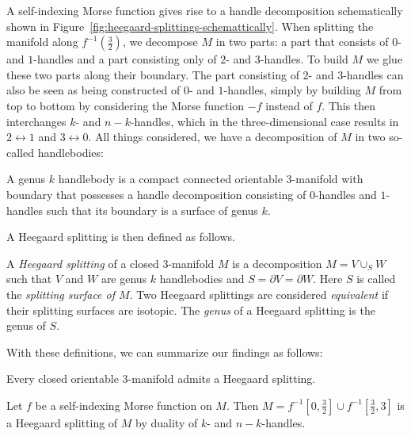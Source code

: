 A self-indexing Morse function gives rise to a handle decomposition schematically shown in Figure~\ref{fig:heegaard-splittings-schemattically}. When splitting the manifold along $f^{-1}(\frac{3}{2})$, we decompose $M$ in two parts: a part that consists of $0$- and $1$-handles and a part consisting only of $2$- and  $3$-handles.
To build $M$ we glue these two parts along their boundary.
The part consisting of $2$- and $3$-handles can also be seen as being constructed of $0$- and $1$-handles, simply by building $M$ from top to bottom by considering the Morse function $-f$ instead of $f$. This then interchanges $k$- and $n-k$-handles, which in the three-dimensional case results in $2 \leftrightarrow 1$ and  $3 \leftrightarrow 0$.
All things considered, we have a decomposition of $M$ in two so-called handlebodies:
\begin{definition}
    A genus $k$ handlebody is a compact connected orientable $3$-manifold with boundary that possesses a handle decomposition consisting of $0$-handles and $1$-handles such that its boundary is a surface of genus $k$.
\end{definition}
A Heegaard splitting is then defined as follows.
\begin{definition}
    A \emph{Heegaard splitting} of a closed $3$-manifold $M$ is a decomposition $M = V \cup _S W$ such that $V$ and $W$ are genus $k$ handlebodies and  $S = \partial V = \partial W$. Here  $S$ is called the \emph{splitting surface of $M$}.
    Two Heegaard splittings are considered \emph{equivalent} if their splitting surfaces are isotopic. The \emph{genus} of a Heegaard splitting is the genus of $S$.
\end{definition}

With these definitions, we can summarize our findings as follows:
\begin{theorem}
    Every closed orientable $3$-manifold admits a Heegaard splitting.
\end{theorem}
\begin{myproof}
    Let $f$ be a self-indexing Morse function on $M$.
    Then $M = f^{-1}\left[0, \tfrac{3}{2}\right] \cup f^{-1}\left[\tfrac{3}{2}, 3\right]$ is a Heegaard splitting of $M$ by duality of $k$- and $n-k$-handles.
\end{myproof}

